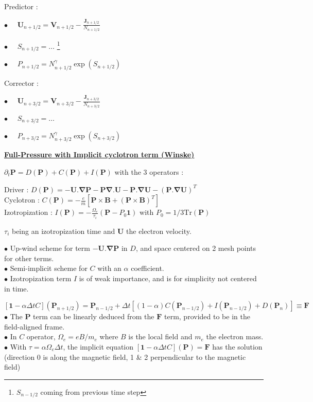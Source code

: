 \documentclass[a4paper,11pt]{letter}
\begin{document}
Predictor :

$\displaystyle \bullet \,\,\,\,\,\,\,\, \mathbf U_{n+1/2} = \mathbf V_{n+1/2} - \frac{\mathbf J_{n+1/2}}{N_{n+1/2}}$

$\displaystyle \bullet \,\,\,\,\,\,\,\, S_{n+1/2} = \dots $ \footnote{$S_{n-1/2}$ coming from previous time step}

$\displaystyle \bullet \,\,\,\,\,\,\,\, P_{n+1/2} = N_{n+1/2}^{\gamma}\exp(S_{n+1/2})$

Corrector :

$\displaystyle \bullet \,\,\,\,\,\,\,\, \mathbf U_{n+3/2} = \mathbf V_{n+3/2} - \frac{\mathbf J_{n+3/2}}{N_{n+3/2}}$

$\displaystyle \bullet \,\,\,\,\,\,\,\, S_{n+3/2} = \dots $

$\displaystyle \bullet \,\,\,\,\,\,\,\, P_{n+3/2} = N_{n+3/2}^{\gamma}\exp(S_{n+3/2})$

\newpage

\underline{\bf Full-Pressure with Implicit cyclotron term (Winske)}

$\partial_t \mathbf P = D(\mathbf P) + C(\mathbf P) + I(\mathbf P)$ with the 3 operators :

Driver : $\displaystyle D(\mathbf P) = -\mathbf U . \boldsymbol{\nabla} \mathbf P - \mathbf P \boldsymbol{\nabla} . \mathbf U - \mathbf P . \boldsymbol{\nabla} \mathbf U - (\mathbf P . \boldsymbol{\nabla} \mathbf U)^T$ \\[0.2cm]
Cyclotron : $\displaystyle C(\mathbf P) = -\frac{e}{m} [\mathbf P \times \mathbf B + (\mathbf P \times \mathbf B)^T]$ \\[0.0cm]
Izotropization : $\displaystyle I(\mathbf P) = -\frac{\Omega_e}{\tau_i} (\mathbf P - P_0 \mathbf 1)$ with $P_0 = 1/3 \mathrm{Tr} (\mathbf P)$

$\tau_i$ being an izotropization time and $\mathbf U$ the electron velocity.

\medskip

$\bullet$ Up-wind scheme for term $-\mathbf U . \boldsymbol{\nabla} \mathbf P$ in $D$, and space centered on 2 mesh points for other terms.\\
$\bullet$ Semi-implicit scheme for $C$ with an $\alpha$ coefficient.\\
$\bullet$ Izotropization term $I$ is of weak importance, and is for simplicity not centered in time.

\bigskip

$$
[\mathbf 1 - \alpha \Delta t C] (\mathbf P_{n+1/2}) = \mathbf P_{n-1/2} + \Delta t [(1- \alpha)C(\mathbf P_{n-1/2}) + I(\mathbf P_{n-1/2}) + D (\mathbf P_n)] \equiv \mathbf F
$$
$\bullet$ The $\mathbf P$ term can be linearly deduced from the $\mathbf F$ term, provided to be in the field-aligned frame.\\
$\bullet$ In $C$ operator, $\Omega_e = e B/m_e$ where $B$ is the local field and $m_e$ the electron mass.\\
$\bullet$  With $\tau = \alpha \Omega_e \Delta t$, the implicit equation $[\mathbf 1 - \alpha \Delta t C] (\mathbf P) = \mathbf F$ has the solution (direction 0 is along the magnetic field, 1 \& 2 perpendicular to the magnetic field)
\end{document}
